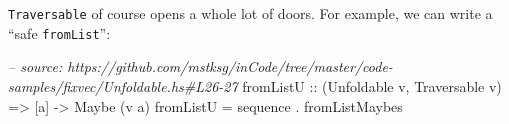 \documentclass[]{article}
\newenvironment{Shaded}{\begin{snugshade}}{\end{snugshade}}
\newcommand{\CommentTok}[1]{\textcolor[rgb]{0.56,0.35,0.01}{\textit{#1}}}
\newcommand{\DataTypeTok}[1]{\textcolor[rgb]{0.13,0.29,0.53}{#1}}
\newcommand{\DecValTok}[1]{\textcolor[rgb]{0.00,0.00,0.81}{#1}}
\newcommand{\FunctionTok}[1]{\textcolor[rgb]{0.00,0.00,0.00}{#1}}
\newcommand{\NormalTok}[1]{#1}
\newcommand{\OtherTok}[1]{\textcolor[rgb]{0.56,0.35,0.01}{#1}}
\newcommand{\StringTok}[1]{\textcolor[rgb]{0.31,0.60,0.02}{#1}}
\begin{document}
\begin{Shaded}
\end{Shaded}

\texttt{Traversable} of course opens a whole lot of doors. For example, we can
write a ``safe \texttt{fromList}'':

\begin{Shaded}
\begin{Highlighting}[]
\CommentTok{-- source: https://github.com/mstksg/inCode/tree/master/code-samples/fixvec/Unfoldable.hs#L26-27}
\OtherTok{fromListU ::}\NormalTok{ (}\DataTypeTok{Unfoldable}\NormalTok{ v, }\DataTypeTok{Traversable}\NormalTok{ v) }\OtherTok{=>}\NormalTok{ [a] }\OtherTok{->} \DataTypeTok{Maybe}\NormalTok{ (v a)}
\NormalTok{fromListU }\FunctionTok{=}\NormalTok{ sequence }\FunctionTok{.}\NormalTok{ fromListMaybes}
\end{Highlighting}
\end{Shaded}
\end{document}
